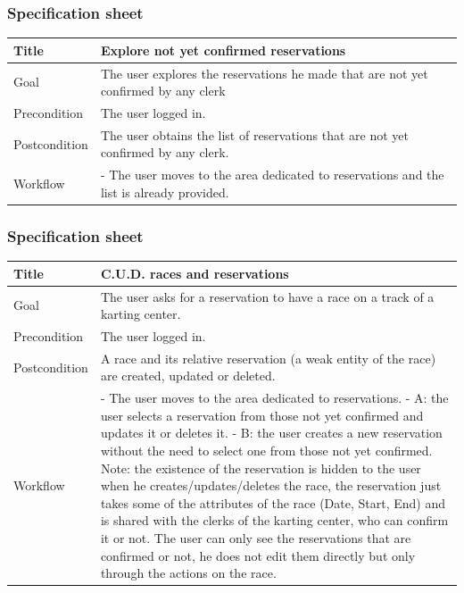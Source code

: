 \documentclass{beamer}
\begin{document}
\begin{frame}
    \frametitle{Specification sheet}
    \begin{table}
        \tiny
        \begin{tabular}{|p{2cm}|p{6cm}|}
        \hline
        Title & \textbf{Explore not yet confirmed reservations} \\
        \hline
        Goal & The user explores the reservations he made that are not yet confirmed by any clerk \\
        \hline
        Precondition & The user logged in. \\
        \hline
        Postcondition & The user obtains the list of reservations that are not yet confirmed by any clerk. \\
        \hline
        Workflow &
        - The user moves to the area dedicated to reservations and the list is already provided. \\
        \hline
        \end{tabular}
\end{table}
\end{frame}


\begin{frame}
    \frametitle{Specification sheet}
    \begin{table}
        \tiny
        \begin{tabular}{|p{2cm}|p{6cm}|}
        \hline
        Title & \textbf{C.U.D. races and reservations} \\
        \hline
        Goal & The user asks for a reservation to have a race on a track of a karting center. \\
        \hline
        Precondition & The user logged in. \\
        \hline
        Postcondition & A race and its relative reservation (a weak entity of the race) are created, updated or deleted. \\
        \hline
        Workflow &
        - The user moves to the area dedicated to reservations. \newline
        - A: the user selects a reservation from those not yet confirmed and updates it or deletes it. \newline
        - B: the user creates a new reservation without the need to select one from those not yet confirmed. \newline
        Note: the existence of the reservation is hidden to the user when he creates/updates/deletes the race,
        the reservation just takes some of the attributes of the race (Date, Start, End) and is shared with the clerks
        of the karting center, who can confirm it or not. The user can only see the reservations that are
        confirmed or not, he does not edit them directly but only through the actions on the race. \\
        \hline
        \end{tabular}
\end{table}
\end{frame}
\end{document}
